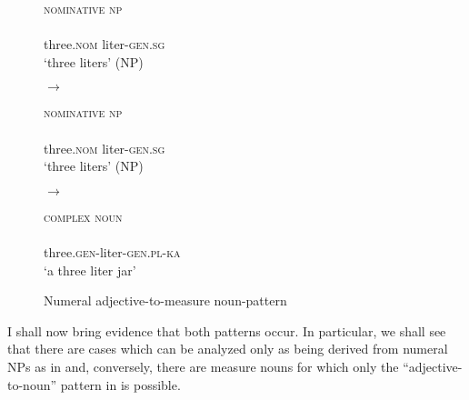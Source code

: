 \documentclass[output=paper]{langscibook}
\begin{document}
\begin{figure}
\small
\hfill\begin{minipage}{\widthof{\hspace{8pt}three.\textsc{nom} liter-\textsc{gen.sg}}}
\textsc{nominative np}\\                                          
\\
\hspace{4pt}three.\textsc{nom} liter-\textsc{gen.sg}\\
\glt \small `three liters' (NP)                                               
\end{minipage}\hfill $\rightarrow$ \hfill
\begin{minipage}{\widthof{\hspace{6pt}three.\textsc{gen}-liter-\textsc{adj}-\textsc{m.sg}}}
\textsc{nominative np}\\                                          
\\
\hspace{4pt}three.\textsc{nom} liter-\textsc{gen.sg}\\
\glt \small `three liters' (NP)                                               
\end{minipage}\hfill $\rightarrow$ \hfill
\begin{minipage}{\widthof{\hspace{6pt}three.\textsc{gen}-liter-\textsc{gen.pl}-\textsc{ka}}}
\textsc{complex noun}\\
\\
\hspace{4pt}three.\textsc{gen}-liter-\textsc{gen.pl}-\textsc{ka}\\
\glt  \small `a three liter jar'
\end{minipage}\hfill

\caption{Numeral adjective-to-measure noun-pattern}\label{ex:khrizmann:8}
\end{figure}


I shall now bring evidence that both patterns occur. In particular, we shall see that there are cases which can be analyzed only as being derived from numeral NPs as in  and, conversely, there are measure nouns for which only the ``adjective-to-noun'' pattern in  is possible.
\end{document}
